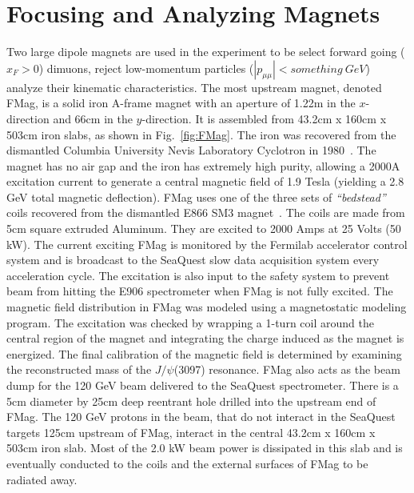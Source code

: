 \section{Focusing and Analyzing Magnets}

Two large dipole magnets are used in the experiment to be select forward going ($x_F > 0$) dimuons, reject low-momentum particles ($|p_{\mu \mu}| < something\ GeV$) analyze their kinematic characteristics. The most upstream magnet, denoted FMag, is a solid iron A-frame magnet with an aperture of 1.22m in the $x$-direction and 66cm in the $y$-direction. It is assembled from 43.2cm x 160cm x 503cm iron slabs, as shown in Fig.~\ref{fig:FMag}. The iron was recovered from the dismantled Columbia University Nevis Laboratory Cyclotron in 1980~\cite{NevisCyclotron}. The magnet has no air gap and the iron has extremely high purity, allowing a 2000A excitation current to generate a central magnetic field of 1.9 Tesla (yielding a 2.8 GeV total magnetic deflection). FMag uses one of the three sets of \emph{``bedstead''} coils recovered from the dismantled E866 SM3 magnet~\cite{PhysRevD.43.2815, PhysRevLett.64.2479, PhysRevLett.80.3715, Towell:2001nh}.  The coils are made from 5cm square extruded Aluminum.  They are excited to 2000 Amps at 25 Volts (50 kW).  The current exciting FMag is monitored by the Fermilab accelerator control system and is broadcast to the SeaQuest slow data acquisition system every acceleration cycle. The excitation is also input to the safety system to prevent beam from hitting the E906 spectrometer when FMag is not fully excited. The magnetic field distribution in FMag was modeled using a magnetostatic modeling program.  The excitation was checked by wrapping a 1-turn coil around the central region of the magnet and integrating the charge induced as the magnet is energized. The final calibration of the magnetic field is determined by examining the reconstructed mass of the $J/\psi$(3097) resonance. FMag also acts as the beam dump for the 120 GeV beam delivered to the SeaQuest spectrometer.  There is a 5cm diameter by 25cm deep reentrant hole drilled into the upstream end of FMag.  The 120 GeV protons in the beam, that do not interact in the SeaQuest targets 125cm upstream of FMag, interact in the central  43.2cm x 160cm x 503cm iron slab.  Most of the 2.0 kW beam power is dissipated in this slab and is eventually conducted to the coils and the external surfaces of FMag to be radiated away.

